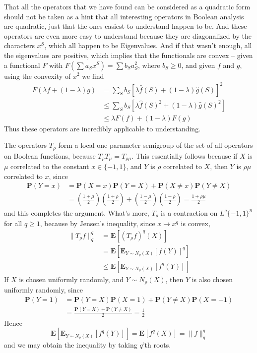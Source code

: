 That all the operators that we have found can be considered as a quadratic form should not be taken as a hint that all interesting operators in Boolean analysis are quadratic, just that the ones easiest to understand happen to be. And these operators are even more easy to understand because they are diagonalized by the characters $x^S$, which all happen to be Eigenvalues. And if that wasn't enough, all the eigenvalues are positive, which implies that the functionals are convex -- given a functional $F$ with $F(\sum a_S x^S) = \sum b_S a_S^2$, where $b_S \geq 0$, and given $f$ and $g$, using the convexity of $x^2$ we find
%
\begin{align*}
    F(\lambda f + (1 - \lambda) g) &= \sum_S b_S \left[ \lambda \widehat{f}(S) + (1 - \lambda) \widehat{g}(S) \right]^2\\
    &\leq \sum_S b_S \left[ \lambda \widehat{f}(S)^2 + (1 - \lambda) \widehat{g}(S)^2 \right]\\
    &\leq \lambda F(f) + (1 - \lambda) F(g)
\end{align*}
%
Thus these operators are incredibly applicable to understanding.

The operators $T_\rho$ form a local one-parameter semigroup of the set of all operators on Boolean functions, because $T_\rho T_\mu = T_{\rho \mu}$. This essentially follows because if $X$ is $\mu$ correlated to the constant $x \in \{ -1, 1 \}$, and $Y$ is $\rho$ correlated to $X$, then $Y$ is $\rho \mu$ correlated to $x$, since
%
\begin{align*}
    \mathbf{P}(Y = x) &= \mathbf{P}(X = x) \mathbf{P}(Y = X) + \mathbf{P}(X \neq x) \mathbf{P}(Y \neq X)\\
    &= \left( \frac{1 + \mu}{2} \right) \left( \frac{1 + \rho}{2} \right) + \left( \frac{1 - \mu}{2} \right) \left( \frac{1 - \rho}{2} \right) = \frac{1 + \rho \mu}{2}
\end{align*}
%
and this completes the argument. What's more, $T_\rho$ is a contraction on $L^q \{ -1,1 \}^n$ for all $q \geq 1$, because by Jensen's inequality, since $x \mapsto x^q$ is convex,
%
\begin{align*}
    \| T_\rho f \|^q_q &= \mathbf{E}[(T_\rho f)^q(X)]\\
    &= \mathbf{E}[\mathbf{E}_{Y \sim N_\rho(X)}[f(Y)]^q]\\
    &\leq \mathbf{E}[\mathbf{E}_{Y \sim N_\rho(X)}[f^q(Y)]]
\end{align*}
%
If $X$ is chosen uniformly randomly, and $Y \sim N_\rho(X)$, then $Y$ is also chosen uniformly randomly, since
%
\begin{align*}
    \mathbf{P}(Y = 1) &= \mathbf{P}(Y = X) \mathbf{P}(X = 1) + \mathbf{P}(Y \neq X) \mathbf{P}(X = -1)\\
    &= \frac{\mathbf{P}(Y = X) + \mathbf{P}(Y \neq X)}{2} = \frac{1}{2}
\end{align*}
%
Hence
%
\[ \mathbf{E}[\mathbf{E}_{Y \sim N_\rho(X)}[f^q(Y)]] = \mathbf{E}[f^q(X)] = \| f \|_q^q \]
%
and we may obtain the inequality by taking $q$'th roots.

